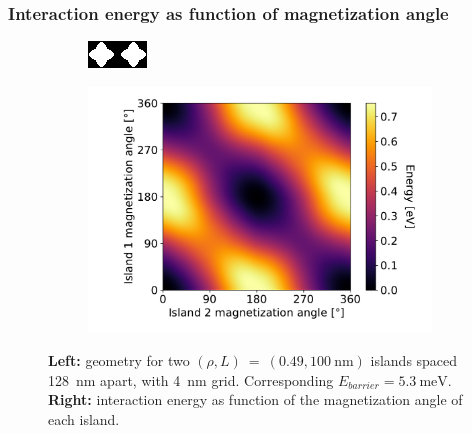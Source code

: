 \documentclass[11pt,a4paper,english]{article}
\begin{document}
\subsubsection{Interaction energy as function of magnetization angle}
\begin{figure}
    \centering
    \begin{subfigure}[c]{4cm} %
         \centering
         \includegraphics[width=\textwidth]{Figures/two_islands/Geometry/geom_r0.49_s100_d128_a0,0_cell4nm.png}
     \end{subfigure}
    \begin{subfigure}[c]{0.7\columnwidth}
         \centering
         \includegraphics[width=\textwidth]{Figures/two_islands/EnergyLandscape/Int_a0Pi,0Pi_d128_r0.49,0.49_cell4nm.pdf}
     \end{subfigure}
    \caption{\textbf{Left:} geometry for two $(\rho, L)~=~(0.49, \SI{100}{\nano\metre})$ islands spaced \SI{128}{\nano\metre} apart, with \SI{4}{\nano\metre} grid. Corresponding $E_{barrier}=\SI{5.3}{\milli\electronvolt}$. \textbf{Right:} interaction energy as function of the magnetization angle of each island.}
    \label{fig:two-islands_interaction_(0.49,100)_a0,0}
\end{figure}
\end{document}

